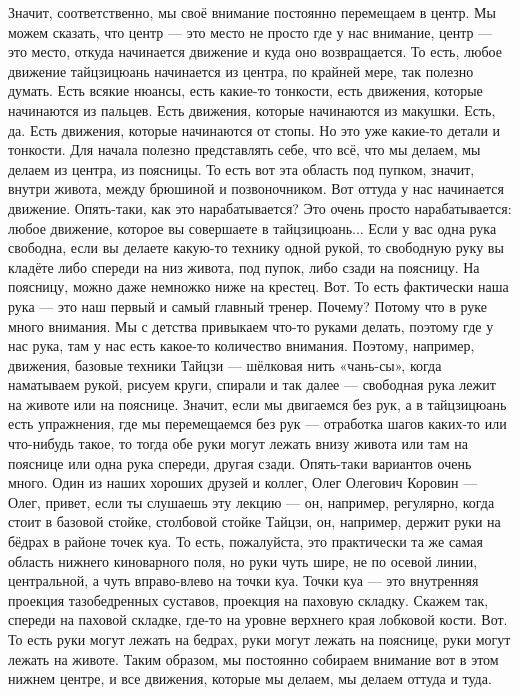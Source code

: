 Значит,
соответственно, мы своё внимание постоянно перемещаем в центр.
Мы можем сказать, что
центр --- это место не просто где у нас внимание, центр --- это место, откуда начинается
движение и куда оно возвращается. То есть, любое движение тайцзицюань начинается из центра,
по крайней мере, так полезно думать. Есть всякие нюансы, есть какие-то тонкости, есть движения,
которые начинаются из пальцев. Есть движения, которые начинаются из макушки. Есть, да. Есть
движения, которые начинаются от стопы. Но это уже какие-то детали и тонкости. Для начала
полезно представлять себе, что всё, что мы делаем, мы делаем из центра, из поясницы. То есть
вот эта область под пупком, значит, внутри живота, между брюшиной и позвоночником. Вот оттуда
у нас начинается движение. Опять-таки, как это нарабатывается? Это очень просто нарабатывается:
любое движение, которое вы совершаете в тайцзицюань... Если у вас одна рука свободна, если вы
делаете какую-то технику одной рукой, то свободную руку вы кладёте либо спереди на низ живота,
под пупок,
либо сзади на поясницу. На поясницу, можно даже немножко ниже на крестец. Вот. То есть
фактически наша рука --- это наш первый и самый главный тренер. Почему? Потому что в руке много
внимания. Мы с детства привыкаем что-то руками делать, поэтому где у нас рука, там у нас есть
какое-то количество внимания. Поэтому, например, движения, базовые техники Тайцзи --- шёлковая
нить «чань-сы»,
когда наматываем рукой, рисуем круги, спирали и так далее --- свободная рука лежит на животе или
на пояснице. Значит, если мы двигаемся без рук, а в тайцзицюань есть упражнения, где мы
перемещаемся без рук ---
отработка шагов каких-то или что-нибудь такое, то тогда обе руки могут лежать внизу живота или
там на пояснице или одна рука спереди, другая сзади. Опять-таки вариантов очень много. Один из
наших хороших друзей и коллег, Олег Олегович Коровин --- Олег, привет, если ты слушаешь эту
лекцию --- он, например, регулярно, когда стоит в базовой стойке, столбовой стойке Тайцзи, он,
например, держит руки на бёдрах в районе точек куа. То есть, пожалуйста, это практически та же
самая область нижнего киноварного поля, но руки чуть шире, не по осевой линии, центральной,
а чуть вправо-влево на точки куа. Точки куа --- это внутренняя проекция тазобедренных суставов,
проекция на паховую складку. Скажем так, спереди на паховой складке, где-то на уровне
верхнего края лобковой кости. Вот. То есть руки могут лежать на бедрах, руки могут
лежать на пояснице, руки могут лежать на животе. Таким образом, мы постоянно собираем внимание
вот в этом нижнем центре, и все движения, которые мы делаем, мы делаем оттуда и туда.


